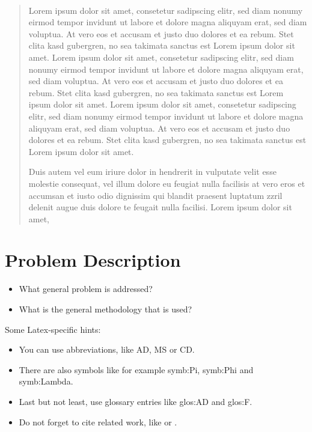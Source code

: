 \documentclass[12pt]%
{article}
\begin{document}
\newpage\thispagestyle{empty}~ %
\newpage 

\begin{abstract}
Lorem ipsum dolor sit amet, consetetur sadipscing elitr, sed diam nonumy eirmod tempor invidunt ut labore et dolore magna aliquyam erat, sed diam voluptua. At vero eos et accusam et justo duo dolores et ea rebum. Stet clita kasd gubergren, no sea takimata sanctus est Lorem ipsum dolor sit amet. Lorem ipsum dolor sit amet, consetetur sadipscing elitr, sed diam nonumy eirmod tempor invidunt ut labore et dolore magna aliquyam erat, sed diam voluptua. At vero eos et accusam et justo duo dolores et ea rebum. Stet clita kasd gubergren, no sea takimata sanctus est Lorem ipsum dolor sit amet. Lorem ipsum dolor sit amet, consetetur sadipscing elitr, sed diam nonumy eirmod tempor invidunt ut labore et dolore magna aliquyam erat, sed diam voluptua. At vero eos et accusam et justo duo dolores et ea rebum. Stet clita kasd gubergren, no sea takimata sanctus est Lorem ipsum dolor sit amet.   

Duis autem vel eum iriure dolor in hendrerit in vulputate velit esse molestie consequat, vel illum dolore eu feugiat nulla facilisis at vero eros et accumsan et iusto odio dignissim qui blandit praesent luptatum zzril delenit augue duis dolore te feugait nulla facilisi. Lorem ipsum dolor sit amet,
\end{abstract}

\newpage

\tableofcontents

\newpage



\section{Problem Description}


\begin{itemize}
\item What general problem is addressed?
\item What is the general methodology that is used?
\end{itemize}

Some Latex-specific hints:


\begin{itemize}
\item You can use abbreviations, like \gls{AD}, \gls{MS} or \gls{CD}.
\item There are also symbols like for example \gls{symb:Pi}, \gls{symb:Phi} and \gls{symb:Lambda}.
\item Last but not least, use glossary entries like \gls{glos:AD} and \gls{glos:F}.
\item Do not forget to cite related work, like \cite{okman2011security} or \cite{borthakur2011apache}.
\end{itemize}
\end{document}
